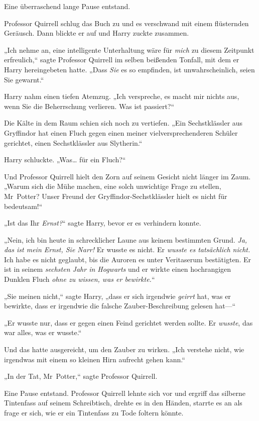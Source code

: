 {Eine überraschend lange Pause entstand.

Professor Quirrell schlug das Buch zu und es verschwand mit einem flüsternden Geräusch. Dann blickte er auf und Harry zuckte zusammen.

„Ich nehme an, eine intelligente Unterhaltung wäre für \emph{mich} zu diesem Zeitpunkt erfreulich,“ sagte Professor Quirrell im selben beißenden Tonfall, mit dem er Harry hereingebeten hatte. „Dass \emph{Sie} es so empfinden, ist unwahrscheinlich, seien Sie gewarnt.“

Harry nahm einen tiefen Atemzug. „Ich verspreche, es macht mir nichts aus, wenn Sie die Beherrschung verlieren. Was ist passiert?“

Die Kälte in dem Raum schien sich noch zu vertiefen. „Ein Sechstklässler aus Gryffindor hat einen Fluch gegen einen meiner vielversprechenderen Schüler gerichtet, einen Sechstklässler aus Slytherin.“

Harry schluckte. „Was… für ein Fluch?“

Und Professor Quirrell hielt den Zorn auf seinem Gesicht nicht länger im Zaum. „Warum sich die Mühe machen, eine solch unwichtige Frage zu stellen, Mr~Potter? Unser Freund der Gryffindor-Sechstklässler hielt es nicht für bedeutsam!“

„Ist das Ihr \emph{Ernst?}“ sagte Harry, bevor er es verhindern konnte.

„Nein, ich bin heute in schrecklicher Laune aus keinem bestimmten Grund. \emph{Ja, das ist mein Ernst, Sie Narr!} Er wusste es nicht. Er \emph{wusste es tatsächlich nicht.} Ich habe es nicht geglaubt, bis die Auroren es unter Veritaserum bestätigten. Er ist in seinem \emph{sechsten Jahr in Hogwarts} und er wirkte einen hochrangigen Dunklen Fluch \emph{ohne zu wissen, was er bewirkte.}“

„Sie meinen nicht,“ sagte Harry, „dass er sich irgendwie \emph{geirrt} hat, was er bewirkte, dass er irgendwie die falsche Zauber-Beschreibung gelesen hat—“

„Er wusste nur, dass er gegen einen Feind gerichtet werden sollte. Er \emph{wusste}, das war alles, was er wusste.“

Und das hatte ausgereicht, um den Zauber zu wirken. „Ich verstehe nicht, wie irgendwas mit einem so kleinen Hirn aufrecht gehen kann.“

„In der Tat, Mr~Potter,“ sagte Professor Quirrell.

Eine Pause entstand. Professor Quirrell lehnte sich vor und ergriff das silberne Tintenfass auf seinem Schreibtisch, drehte es in den Händen, starrte es an als frage er sich, wie er ein Tintenfass zu Tode foltern könnte.

}
